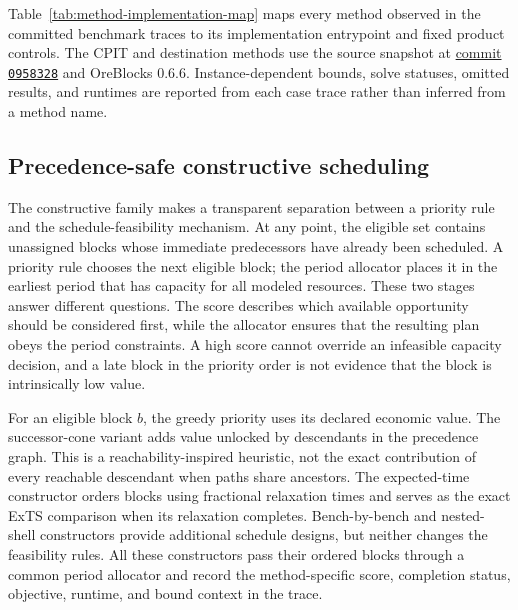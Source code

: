 Table~\ref{tab:method-implementation-map} maps every method observed in the committed benchmark traces to its implementation entrypoint and fixed product controls. The CPIT and destination methods use the source snapshot at \href{https://github.com/fsantibanezleal/CAOS_PhaseFlow/commit/09583286831d3b4be30dff370cb4691a6cec869d}{commit \texttt{0958328}} and OreBlocks 0.6.6. Instance-dependent bounds, solve statuses, omitted results, and runtimes are reported from each case trace rather than inferred from a method name.



\subsection{Precedence-safe constructive scheduling}
\label{sec:method-construction}
The constructive family makes a transparent separation between a priority rule and the schedule-feasibility mechanism. At any point, the eligible set contains unassigned blocks whose immediate predecessors have already been scheduled. A priority rule chooses the next eligible block; the period allocator places it in the earliest period that has capacity for all modeled resources. These two stages answer different questions. The score describes which available opportunity should be considered first, while the allocator ensures that the resulting plan obeys the period constraints. A high score cannot override an infeasible capacity decision, and a late block in the priority order is not evidence that the block is intrinsically low value.

For an eligible block $b$, the greedy priority uses its declared economic value. The successor-cone variant adds value unlocked by descendants in the precedence graph. This is a reachability-inspired heuristic, not the exact contribution of every reachable descendant when paths share ancestors. The expected-time constructor orders blocks using fractional relaxation times and serves as the exact ExTS comparison when its relaxation completes. Bench-by-bench and nested-shell constructors provide additional schedule designs, but neither changes the feasibility rules. All these constructors pass their ordered blocks through a common period allocator and record the method-specific score, completion status, objective, runtime, and bound context in the trace.

